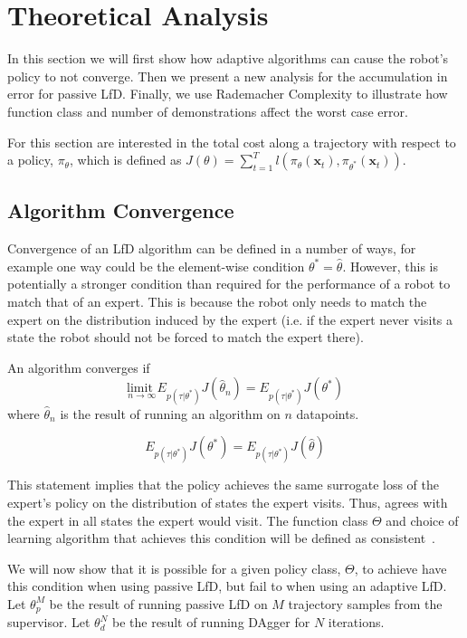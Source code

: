 \documentclass[10pt, conference]{ieeeconf}      %
\newcommand{\bx}{\mathbf{x}}
\begin{document}
 

\section{Theoretical Analysis}
In this section we will first show how adaptive algorithms can cause the robot's policy to not converge. Then we present a new analysis for the accumulation in error for  passive LfD.  Finally, we use Rademacher Complexity to illustrate how function class and number of demonstrations affect the worst case error. 

For this section are interested in the total cost along a trajectory with respect to a policy, $\pi_{\theta}$, which is defined as $J(\theta) = \sum^T_{t=1} l(\pi_{\theta}(\bx_{t}),\pi_{\theta^*}(\bx_{t}))$. 

\subsection{Algorithm Convergence}

Convergence of an LfD algorithm can be defined in a number of ways, for example one way could be the element-wise condition $\theta^* = \hat{\theta}$. However, this is potentially a stronger condition than required for the performance of a robot to match that of an expert.  This is because the robot only needs to match the expert on the distribution induced by the expert (i.e. if the expert never visits a state the robot should not be forced to match the expert there). 

An algorithm converges if
$$\underset{n \rightarrow \infty}{\text{limit }} E_{p(\tau|\theta^*)}J(\hat{\theta}_n)  = E_{p(\tau|\theta^*)}J(\theta^*) $$
\noindent where $\hat{\theta}_n$ is the result of running an algorithm on $n$ datapoints.

$$E_{p(\tau|\theta^*)}J(\theta^*) = E_{p(\tau|\theta^*)}J(\hat{\theta}) $$

This statement implies that the policy achieves the same surrogate loss of the expert's policy on the distribution of states the expert visits. Thus, agrees with the expert in all states the expert would visit.  The function class $\Theta$ and choice of learning algorithm that achieves this condition will be defined as consistent~\cite{vapnik1992principles}.


We will now show that it is possible for a given policy class, $\Theta$, to achieve have this condition when using passive LfD, but fail to when using an adaptive LfD. \\
Let $\theta_{p}^M$ be the result of running passive LfD on $M$ trajectory samples from the supervisor.
Let $\theta_{d}^N$ be the result of running DAgger for $N$ iterations.
\end{document}
